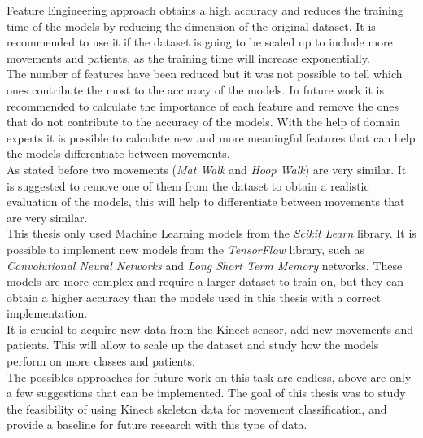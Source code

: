         Feature Engineering approach obtains a high accuracy and reduces the training time of the models by reducing the dimension of the original dataset. It is recommended to use it if the dataset is going to be scaled up to include more movements and patients, as the training time will increase exponentially.\\
        The number of features have been reduced but it was not possible to tell which ones contribute the most to the accuracy of the models. In future work it is recommended to calculate the importance of each feature and remove the ones that do not contribute to the accuracy of the models. With the help of domain experts it is possible to calculate new and more meaningful features that can help the models differentiate between movements. \\
        As stated before two movements (\textit{Mat Walk} and \textit{Hoop Walk}) are very similar. It is suggested to remove one of them from the dataset to obtain a realistic evaluation of the models, this will help to differentiate between movements that are very similar.\\
        
        This thesis only used Machine Learning models from the \textit{Scikit Learn} library. It is possible to implement new models from the \textit{TensorFlow} library, such as \textit{Convolutional Neural Networks} and \textit{Long Short Term Memory} networks. These models are more complex and require a larger dataset to train on, but they can obtain a higher accuracy than the models used in this thesis with a correct implementation. \\
        It is crucial to acquire new data from the Kinect sensor, add new movements and patients. This will allow to scale up the dataset and study how the models perform on more classes and patients. \\

        The possibles approaches for future work on this task are endless, above are only a few suggestions that can be implemented. The goal of this thesis was to study the feasibility of using Kinect skeleton data for movement classification, and provide a baseline for future research with this type of data. \\
    
    \cleardoublepage